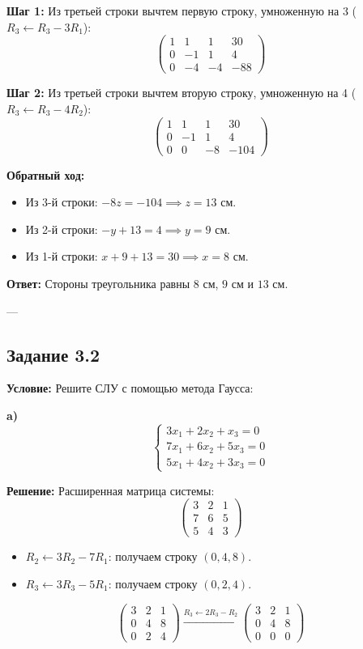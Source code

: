 \documentclass[11pt, a4paper]{article}
\begin{document}
\textbf{Шаг 1:} Из третьей строки вычтем первую строку, умноженную на 3 ($R_3 \leftarrow R_3 - 3R_1$):
$$ \left(\begin{array}{ccc|c} 
1 & 1 & 1 & 30 \\ 
0 & -1 & 1 & 4 \\ 
0 & -4 & -4 & -88 
\end{array}\right) $$

\textbf{Шаг 2:} Из третьей строки вычтем вторую строку, умноженную на 4 ($R_3 \leftarrow R_3 - 4R_2$):
$$ \left(\begin{array}{ccc|c} 
1 & 1 & 1 & 30 \\ 
0 & -1 & 1 & 4 \\ 
0 & 0 & -8 & -104 
\end{array}\right) $$

\textbf{Обратный ход:}
\begin{itemize}
\item Из 3-й строки: $-8z = -104 \implies z = 13\text{ см}$.
\item Из 2-й строки: $-y + 13 = 4 \implies y = 9\text{ см}$.
\item Из 1-й строки: $x + 9 + 13 = 30 \implies x = 8\text{ см}$.
\end{itemize}

\textbf{Ответ:} Стороны треугольника равны $8\text{ см}$, $9\text{ см}$ и $13\text{ см}$.

---

\subsection*{Задание 3.2}
\textbf{Условие:} Решите СЛУ с помощью метода Гаусса:

\medskip
\textbf{a)}
$$ \begin{cases} 3x_1 + 2x_2 + x_3 = 0 \\ 7x_1 + 6x_2 + 5x_3 = 0 \\ 5x_1 + 4x_2 + 3x_3 = 0 \end{cases} $$

\textbf{Решение:}
Расширенная матрица системы:
$$ \begin{pmatrix} 3 & 2 & 1 \\ 7 & 6 & 5 \\ 5 & 4 & 3 \end{pmatrix} $$
\begin{itemize}
\item $R_2 \leftarrow 3R_2 - 7R_1$: получаем строку $(0, 4, 8)$.
\item $R_3 \leftarrow 3R_3 - 5R_1$: получаем строку $(0, 2, 4)$.
\end{itemize}
$$ \begin{pmatrix} 3 & 2 & 1 \\ 0 & 4 & 8 \\ 0 & 2 & 4 \end{pmatrix} \xrightarrow{R_3 \leftarrow 2R_3 - R_2} \begin{pmatrix} 3 & 2 & 1 \\ 0 & 4 & 8 \\ 0 & 0 & 0 \end{pmatrix} $$
\end{document}

